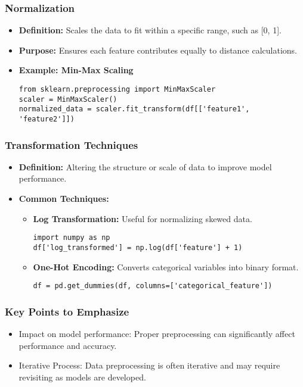 \documentclass[aspectratio=169]{beamer}
\begin{document}
\begin{frame}[fragile]
    \frametitle{Normalization}
    \begin{itemize}
        \item \textbf{Definition:} Scales the data to fit within a specific range, such as [0, 1].
        \item \textbf{Purpose:} Ensures each feature contributes equally to distance calculations.
        \item \textbf{Example: Min-Max Scaling}
        \begin{lstlisting}
from sklearn.preprocessing import MinMaxScaler
scaler = MinMaxScaler()
normalized_data = scaler.fit_transform(df[['feature1', 'feature2']])
        \end{lstlisting}
    \end{itemize}
\end{frame}

\begin{frame}[fragile]
    \frametitle{Transformation Techniques}
    \begin{itemize}
        \item \textbf{Definition:} Altering the structure or scale of data to improve model performance.
        \item \textbf{Common Techniques:}
        \begin{itemize}
            \item \textbf{Log Transformation:} Useful for normalizing skewed data.
            \begin{lstlisting}
import numpy as np
df['log_transformed'] = np.log(df['feature'] + 1)
            \end{lstlisting}
            \item \textbf{One-Hot Encoding:} Converts categorical variables into binary format.
            \begin{lstlisting}
df = pd.get_dummies(df, columns=['categorical_feature'])
            \end{lstlisting}
        \end{itemize}
    \end{itemize}
\end{frame}

\begin{frame}
    \frametitle{Key Points to Emphasize}
    \begin{itemize}
        \item Impact on model performance: Proper preprocessing can significantly affect performance and accuracy.
        \item Iterative Process: Data preprocessing is often iterative and may require revisiting as models are developed.
    \end{itemize}
\end{frame}
\end{document}
